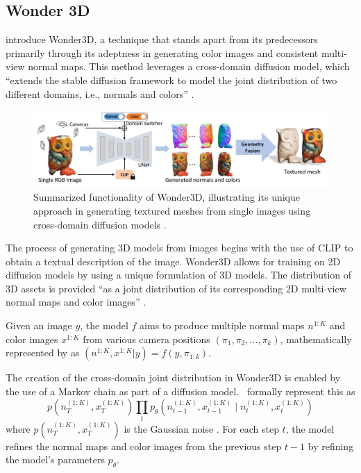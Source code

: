 \subsection{Wonder 3D}\label{Wonder3D}

\citeauthor{long2023wonder3d} introduce Wonder3D, a technique that stands apart from its predecessors primarily through its adeptness in generating color images and consistent multi-view normal maps. This method leverages a cross-domain diffusion model, which ``extends the stable diffusion framework to model the joint distribution of two different domains, i.e., normals and colors'' \citep{long2023wonder3d}.


\begin{figure}[ht]
  \centering
    \includegraphics[width=1\columnwidth]{figures/Wonder3D.png}
    \caption{Summarized functionality of Wonder3D, illustrating its unique approach in generating textured meshes from single images using cross-domain diffusion models \citep{long2023wonder3d}.}\label{fig:Wonder3D}
\end{figure}

The process of generating 3D models from images begins with the use of CLIP \citep{radfordCLIP} to obtain a textual description of the image. Wonder3D allows for training on 2D diffusion models by using a unique formulation of 3D models. The distribution of 3D assets is provided ``as a joint distribution of its corresponding 2D multi-view normal maps and color images'' \citep{long2023wonder3d}. 

Given an image \( y \), the model \(f\) aims to produce multiple normal maps \( n^{1:K} \) and color images \( x^{1:K} \) from various camera positions \((\pi_1, \pi_2, \ldots, \pi_k)\), mathematically represented by \citeauthor{long2023wonder3d} as \((n^{1:K}, x^{1:K} | y) = f(y, \pi_{1:k})\).

The creation of the cross-domain joint distribution in Wonder3D is enabled by the use of a Markov chain as part of a diffusion model.~\citeauthor{long2023wonder3d} formally represent this as \[ p\left(n_T^{(1: K)}, x_T^{(1: K)}\right) \prod_t p_\theta\left(n_{t-1}^{(1: K)}, x_{t-1}^{(1: K)} \mid n_t^{(1: K)}, x_t^{(1: K)}\right) \] where \( p\left(n_T^{(1: K)}, x_T^{(1: K)}\right) \) is the Gaussian noise \citep{long2023wonder3d}. For each step \(t\), the model refines the normal maps and color images from the previous step \(t-1\) by refining the model's parameters \(p_\theta\).

